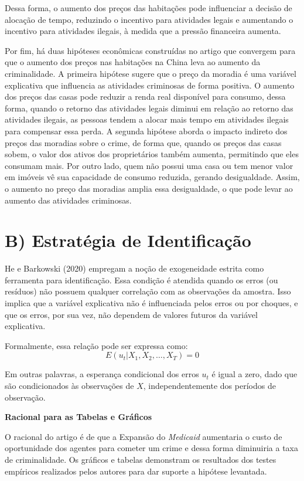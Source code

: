 \documentclass[12pt]{article}
\begin{document}
Dessa forma, o aumento dos preços das habitações pode influenciar a
decisão de alocação de tempo, reduzindo o incentivo para atividades
legais e aumentando o incentivo para atividades ilegais, à medida que a
pressão financeira aumenta.

Por fim, há duas hipóteses econômicas construídas no artigo que convergem para que o aumento dos preços nas habitações na China leva ao aumento da criminalidade. A primeira hipótese sugere que o preço da moradia é uma variável explicativa que influencia as atividades criminosas de forma positiva. O aumento dos preços das casas pode reduzir a renda real disponível para consumo, dessa forma, quando o retorno das atividades legais diminui em relação ao retorno das
atividades ilegais, as pessoas tendem a alocar mais tempo em atividades
ilegais para compensar essa perda. A segunda hipótese aborda o impacto
indireto dos preços das moradias sobre o crime, de forma que, quando os
preços das casas sobem, o valor dos ativos dos proprietários também
aumenta, permitindo que eles consumam mais. Por outro lado, quem não
possui uma casa ou tem menor valor em imóveis vê sua capacidade de
consumo reduzida, gerando desigualdade. Assim, o aumento no preço das
moradias amplia essa desigualdade, o que pode levar ao aumento das
atividades criminosas.


  \vspace*{1cm}
\section*{B) Estratégia de Identificação}

He e Barkowski (2020) empregam a noção de exogeneidade estrita como ferramenta para identificação. Essa condição é atendida quando os erros (ou resíduos) não possuem qualquer correlação com as observações da amostra. Isso implica que a variável explicativa não é influenciada pelos erros ou por choques, e que os erros, por sua vez, não dependem de valores futuros da variável explicativa.

Formalmente, essa relação pode ser expressa como:
\[
E(u_t | X_1, X_2, \dots, X_T) = 0
\]

Em outras palavras, a esperança condicional dos erros $u_t$ é igual a zero, dado que são condicionados às observações de $X$, independentemente dos períodos de observação.


 \vspace*{1cm}
\textbf{Racional para as Tabelas e Gráficos}

O racional do artigo é de que a Expansão do \emph{Medicaid} aumentaria o
custo de oportunidade dos agentes para cometer um crime e dessa forma
diminuiria a taxa de criminalidade. Os gráficos e tabelas demonstram os
resultados dos testes empíricos realizados pelos autores para dar
suporte a hipótese levantada.
\end{document}
